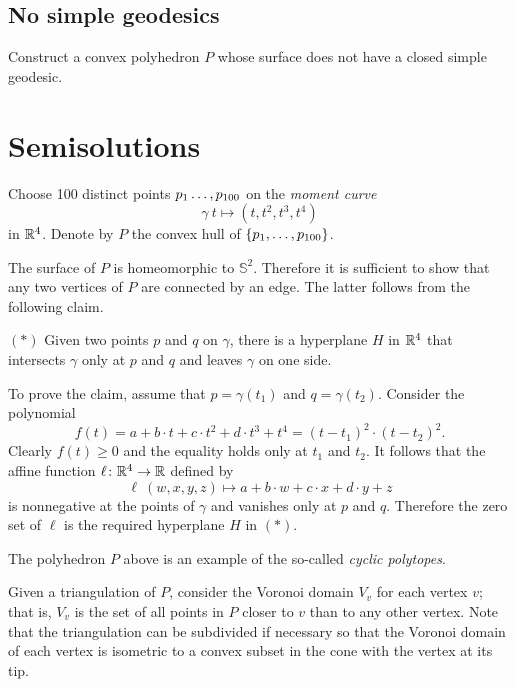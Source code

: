 \subsection*{No simple geodesics\easy}\label{No simple geodesics}

\begin{pr}
Construct a convex polyhedron $P$ whose surface 
does not have a closed simple geodesic.
\end{pr}

\section*{Semisolutions}


Choose 100 distinct points $p_1\z\dots,p_{100}$
on the {}\emph{moment curve} 
\[\gamma\:t\mapsto (t,t^2,t^3,t^4)\] 
in $\mathbb{R}^4$.
Denote by $P$ the convex hull of $\{p_1,\z\dots,p_{100}\}$.

The surface of $P$ is homeomorphic to $\mathbb{S}^2$.
Therefore it is sufficient to show that any two vertices of $P$ are connected by an edge.
The latter follows from the following claim.

\begin{cl}{$({*})$}
Given two points $p$ and $q$ on $\gamma$, there is a hyperplane $H$ in $\mathbb{R}^4$ that intersects $\gamma$ only at $p$ and $q$ and leaves $\gamma$ on one side.
\end{cl}

To prove the claim, assume that $p=\gamma(t_1)$ and $q=\gamma(t_2)$. 
Consider the polynomial
\[f(t)=a+b\cdot t+c\cdot t^2+d\cdot t^3+t^4=(t-t_1)^2\cdot(t-t_2)^2.\]
Clearly $f(t)\ge 0$ and the equality holds only at $t_1$ and $t_2$.
It follows that the affine function $\ell\colon\mathbb{R}^4\to\mathbb{R}$ defined by 
\[\ell\:(w,x,y,z)\mapsto a+b\cdot w+c\cdot x+d\cdot y+z\]
is nonnegative at the points of $\gamma$ and vanishes only at $p$ and $q$.
Therefore the zero set of $\ell$ is the required hyperplane $H$ in $({*})$. 
\qeds

The polyhedron $P$ above is an example of the so-called \emph{cyclic polytopes}.

Given a triangulation of $P$,
consider the Voronoi domain $V_v$ for each vertex $v$;
that is, $V_v$ is the set of all points in $P$ closer to $v$ than to any other vertex.
Note that the triangulation can be subdivided if necessary
so that the Voronoi domain of each vertex is isometric to a convex subset in the cone with the vertex at its tip.

